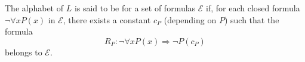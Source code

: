 The alphabet of $L$ is said to be  for a set of formulas $\mathcal{E}$ if, for each closed formula $\neg \forall x P(x)$ in $\mathcal{E}$, there exists a constant $c_P$ (depending on $P$) such that the formula
$$R_P: \neg \forall x P(x) \Rightarrow \neg P(c_P)$$
belongs to $\mathcal{E}$.
